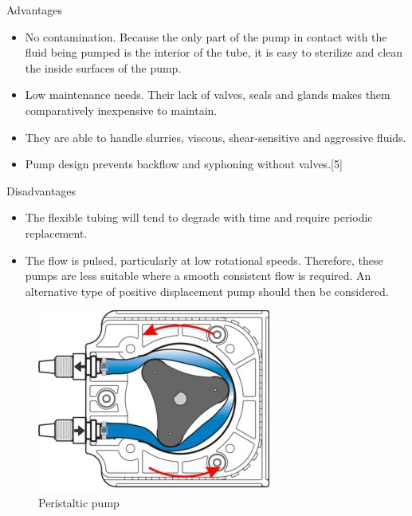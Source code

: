 \noindent Advantages

\begin{itemize}
\item No contamination. Because the only part of the pump in contact with the fluid being pumped is the interior of the tube, it is easy to sterilize and clean the inside surfaces of the pump.
\item Low maintenance needs. Their lack of valves, seals and glands makes them comparatively inexpensive to maintain.
\item They are able to handle slurries, viscous, shear-sensitive and aggressive fluids.
\item Pump design prevents backflow and syphoning without valves.[5]
\end{itemize}

\noindent Disadvantages
\begin{itemize}
\item The flexible tubing will tend to degrade with time and require periodic replacement.
\item The flow is pulsed, particularly at low rotational speeds. Therefore, these pumps are less suitable where a smooth consistent flow is required. An alternative type of positive displacement pump should then be considered.
\end{itemize}


\begin{figure}[h!]
\begin{center}
\includegraphics[width=0.4 \textwidth]{figs/per_pumphead.jpg}
\caption{\label{fig:per_pump} Peristaltic pump}
\end{center}
\end{figure}





